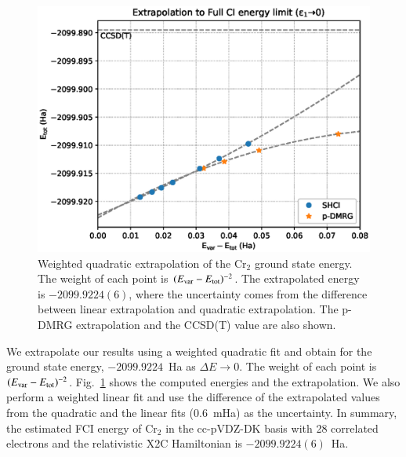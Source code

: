 \begin{figure}
  \includegraphics[width=\linewidth]{figs/extrapolate.eps}
  \caption{Weighted quadratic extrapolation of the Cr$_2$ ground state energy.
  The weight of each point is $(E_{\rm var} - E_{\rm tot})^{-2}$.
  The extrapolated energy is $-2099.9224(6)$, where the uncertainty comes from the difference between linear extrapolation and quadratic extrapolation.
  The p-DMRG extrapolation and the CCSD(T) value are also shown.
}
  \label{fig:extrapolation}
\end{figure}

We extrapolate our results using a weighted quadratic fit
and obtain for the ground state energy, $-2099.9224$~Ha as $\Delta E\to0$.
The weight of each point is $(E_{\rm var} - E_{\rm tot})^{-2}$.
Fig.~\ref{fig:extrapolation} shows the computed energies and the extrapolation.
We also perform a weighted linear fit and use the difference of the extrapolated values from the quadratic and the linear fits (0.6~mHa) as the uncertainty.
In summary, the estimated FCI energy of Cr$_2$ in the cc-pVDZ-DK basis with 28 correlated electrons and the relativistic X2C Hamiltonian
is $-2099.9224(6)$~Ha.

